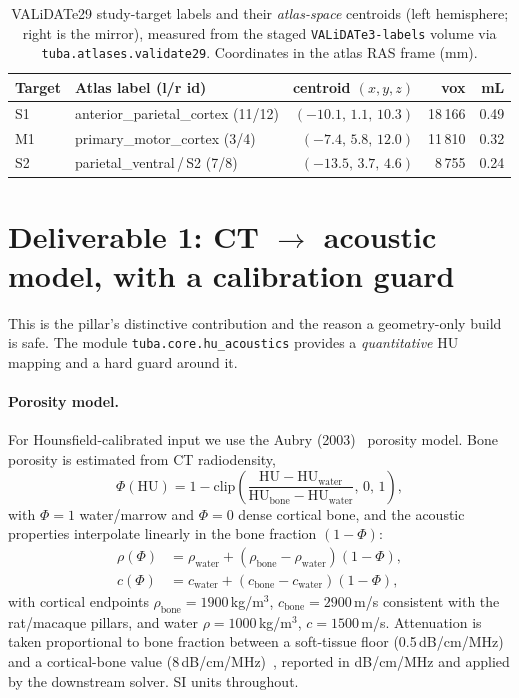 \documentclass{compactarticle}
\providecommand{\br}{\toprule}
\providecommand{\mr}{\midrule}
\begin{document}
\begin{table}[H]
\centering
\caption{VALiDATe29 study-target labels and their \emph{atlas-space}
         centroids (left hemisphere; right is the mirror), measured from
         the staged \texttt{VALiDATe3-labels} volume via
         \texttt{tuba.atlases.validate29}. Coordinates in the atlas RAS
         frame (mm).}
\label{tab:targets}
\small
\begin{tabular}{llrrr}
\br
Target & Atlas label (l/r id) & centroid $(x,y,z)$ & vox & mL \\
\mr
S1 & anterior\_parietal\_cortex (11/12) & $(-10.1,\,1.1,\,10.3)$ & 18\,166 & 0.49 \\
M1 & primary\_motor\_cortex (3/4)       & $(-7.4,\,5.8,\,12.0)$  & 11\,810 & 0.32 \\
S2 & parietal\_ventral\,/\,S2 (7/8)     & $(-13.5,\,3.7,\,4.6)$  & 8\,755  & 0.24 \\
\mr
\end{tabular}
\end{table}

\section{Deliverable 1: CT $\to$ acoustic model, with a calibration guard}
\label{sec:acoustic}

This is the pillar's distinctive contribution and the reason a
geometry-only build is safe. The module
\texttt{tuba.core.hu\_acoustics} provides a \emph{quantitative} HU
mapping and a hard guard around it.

\paragraph{Porosity model.}
For Hounsfield-calibrated input we use the Aubry
(2003)~\cite{aubry-2003} porosity model. Bone porosity is estimated
from CT radiodensity,
\begin{equation}
\Phi(\mathrm{HU}) = 1 - \mathrm{clip}\!\left(
   \frac{\mathrm{HU}-\mathrm{HU}_{\text{water}}}
        {\mathrm{HU}_{\text{bone}}-\mathrm{HU}_{\text{water}}},\,0,\,1\right),
\end{equation}
with $\Phi = 1$ water/marrow and $\Phi = 0$ dense cortical bone, and
the acoustic properties interpolate linearly in the bone fraction
$(1-\Phi)$:
\begin{align}
\rho(\Phi) &= \rho_{\text{water}} + (\rho_{\text{bone}}-\rho_{\text{water}})(1-\Phi),\\
c(\Phi)    &= c_{\text{water}} + (c_{\text{bone}}-c_{\text{water}})(1-\Phi),
\end{align}
with cortical endpoints $\rho_{\text{bone}}=1900$\,kg/m$^3$,
$c_{\text{bone}}=2900$\,m/s consistent with the rat/macaque pillars,
and water $\rho=1000$\,kg/m$^3$, $c=1500$\,m/s. Attenuation is taken
proportional to bone fraction between a soft-tissue floor
(0.5\,dB/cm/MHz) and a cortical-bone value
(8\,dB/cm/MHz)~\cite{pinton-2012,pichardo-2011}, reported in
dB/cm/MHz and applied by the downstream solver. SI units throughout.
\end{document}
